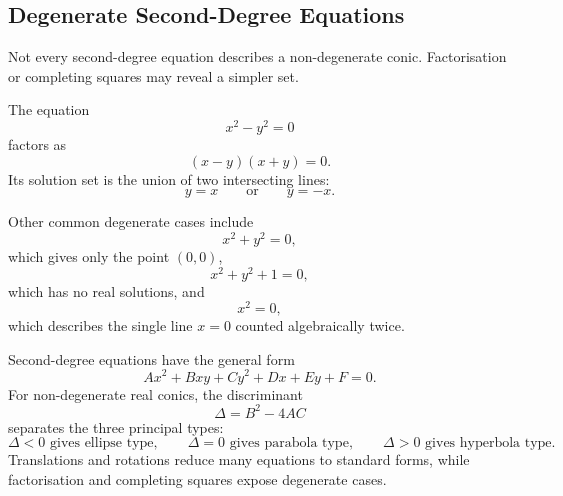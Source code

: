 \subsection{Degenerate Second-Degree Equations}

Not every second-degree equation describes a non-degenerate conic. Factorisation
or completing squares may reveal a simpler set.

\begin{examplebox}
The equation
\[
x^2-y^2=0
\]
factors as
\[
(x-y)(x+y)=0.
\]
Its solution set is the union of two intersecting lines:
\[
y=x
\qquad\text{or}\qquad
y=-x.
\]
\end{examplebox}

\begin{center}
\end{center}

Other common degenerate cases include
\[
x^2+y^2=0,
\]
which gives only the point $(0,0)$,
\[
x^2+y^2+1=0,
\]
which has no real solutions, and
\[
x^2=0,
\]
which describes the single line $x=0$ counted algebraically twice.

\begin{summarybox}
Second-degree equations have the general form
\[
Ax^2+Bxy+Cy^2+Dx+Ey+F=0.
\]
For non-degenerate real conics, the discriminant
\[
\Delta=B^2-4AC
\]
separates the three principal types:
\[
\Delta<0\text{ gives ellipse type},\qquad
\Delta=0\text{ gives parabola type},\qquad
\Delta>0\text{ gives hyperbola type}.
\]
Translations and rotations reduce many equations to standard forms, while
factorisation and completing squares expose degenerate cases.
\end{summarybox}
